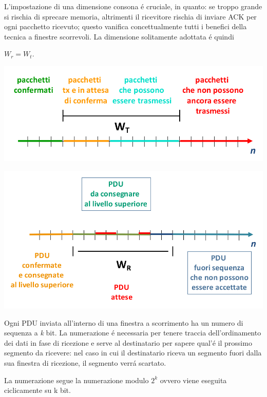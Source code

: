 \documentclass[12pt]{article}
\begin{document}
L'impostazione di una dimensione consona \'e cruciale, in quanto: se troppo grande si rischia di sprecare memoria, 
altrimenti il ricevitore rischia di inviare ACK per ogni pacchetto ricevuto; questo vanifica 
concettualmente tutti i benefici della tecnica a finestre scorrevoli. La dimensione solitamente adottata \'e quindi 
\begin{center}
	$W_r = W_t$.
\end{center}

\begin{center}
	\includegraphics[scale=0.3]{livello_trasporto-img18.png}
\end{center}

\begin{center}
	\includegraphics[scale=0.3]{livello_trasporto-img19.png}
\end{center}

Ogni PDU inviata all'interno di una finestra a scorrimento ha un numero di sequenza a \textit{k} bit. 
La numerazione \'e necessaria per tenere traccia dell'ordinamento dei dati in fase di ricezione e serve al 
destinatario per sapere qual'\'e il prossimo segmento da ricevere: nel caso in cui il destinatario riceva un 
segmento fuori dalla sua finestra di ricezione, il segmento verr\'a scartato.

La numerazione segue la numerazione modulo $2^k$ ovvero viene eseguita ciclicamente su k bit.
\end{document}
